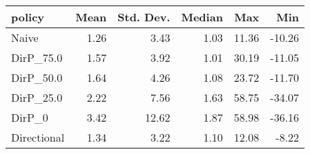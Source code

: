 \begin{tabular}{lrrrrr}
\toprule
     policy &  Mean &  Std. Dev. &  Median &   Max &    Min \\
\midrule
      Naive &  1.26 &       3.43 &    1.03 & 11.36 & -10.26 \\
  DirP\_75.0 &  1.57 &       3.92 &    1.01 & 30.19 & -11.05 \\
  DirP\_50.0 &  1.64 &       4.26 &    1.08 & 23.72 & -11.70 \\
  DirP\_25.0 &  2.22 &       7.56 &    1.63 & 58.75 & -34.07 \\
     DirP\_0 &  3.42 &      12.62 &    1.87 & 58.98 & -36.16 \\
Directional &  1.34 &       3.22 &    1.10 & 12.08 &  -8.22 \\
\bottomrule
\end{tabular}
